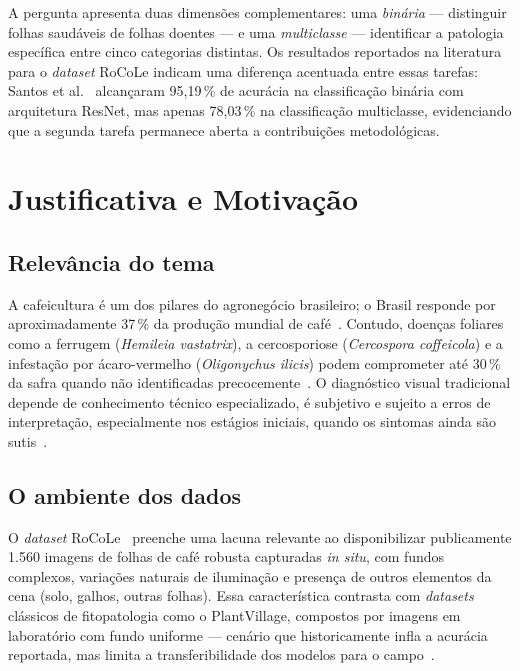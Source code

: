 \documentclass[11pt,a4paper]{article}
\begin{document}
A pergunta apresenta duas dimensões complementares: uma \textit{binária} --- distinguir folhas saudáveis de folhas doentes --- e uma \textit{multiclasse} --- identificar a patologia específica entre cinco categorias distintas. Os resultados reportados na literatura para o \textit{dataset} RoCoLe indicam uma diferença acentuada entre essas tarefas: Santos et al.~\cite{santos2023} alcançaram 95,19\,\% de acurácia na classificação binária com arquitetura ResNet, mas apenas 78,03\,\% na classificação multiclasse, evidenciando que a segunda tarefa permanece aberta a contribuições metodológicas.

\section{Justificativa e Motivação}

\subsection*{Relevância do tema}

A cafeicultura é um dos pilares do agronegócio brasileiro; o Brasil responde por aproximadamente 37\,\% da produção mundial de café~\cite{conab}. Contudo, doenças foliares como a ferrugem (\textit{Hemileia vastatrix}), a cercosporiose (\textit{Cercospora coffeicola}) e a infestação por ácaro-vermelho (\textit{Oligonychus ilicis}) podem comprometer até 30\,\% da safra quando não identificadas precocemente~\cite{matiello2016}. O diagnóstico visual tradicional depende de conhecimento técnico especializado, é subjetivo e sujeito a erros de interpretação, especialmente nos estágios iniciais, quando os sintomas ainda são sutis~\cite{barbedo2018}.

\subsection*{O ambiente dos dados}

O \textit{dataset} RoCoLe~\cite{parraga2019} preenche uma lacuna relevante ao disponibilizar publicamente 1.560 imagens de folhas de café robusta capturadas \textit{in situ}, com fundos complexos, variações naturais de iluminação e presença de outros elementos da cena (solo, galhos, outras folhas). Essa característica contrasta com \textit{datasets} clássicos de fitopatologia como o PlantVillage, compostos por imagens em laboratório com fundo uniforme --- cenário que historicamente infla a acurácia reportada, mas limita a transferibilidade dos modelos para o campo~\cite{barbedo2019}.
\end{document}
